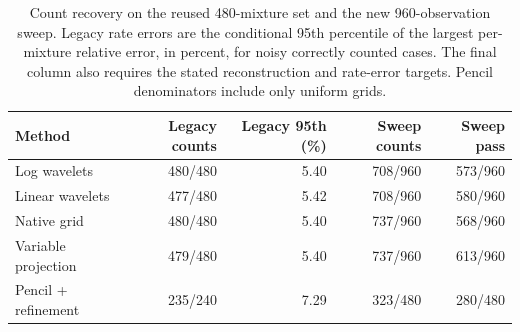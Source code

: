 \begin{table}[htbp]
\centering\small
\caption{Count recovery on the reused 480-mixture set and the new 960-observation sweep. Legacy rate errors are the conditional 95th percentile of the largest per-mixture relative error, in percent, for noisy correctly counted cases. The final column also requires the stated reconstruction and rate-error targets. Pencil denominators include only uniform grids.}\label{tab:research-counts}
\begin{tabular}{@{}lrrrr@{}}
\toprule
Method & Legacy counts & Legacy 95th (\%) & Sweep counts & Sweep pass \\
\midrule
Log wavelets & 480/480 & 5.40 & 708/960 & 573/960 \\
Linear wavelets & 477/480 & 5.42 & 708/960 & 580/960 \\
Native grid & 480/480 & 5.40 & 737/960 & 568/960 \\
Variable projection & 479/480 & 5.40 & 737/960 & 613/960 \\
Pencil + refinement & 235/240 & 7.29 & 323/480 & 280/480 \\
\bottomrule
\end{tabular}
\end{table}
